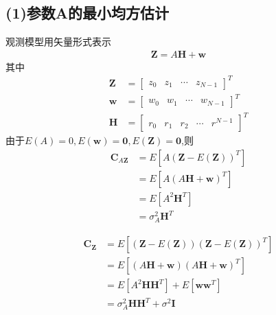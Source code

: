 \documentclass[fontset=windows]{article}
\numberwithin{figure}{section}
\begin{document}
\subsection*{(1)参数A的最小均方估计}
观测模型用矢量形式表示
\begin{align*}
    \mathbf{Z}=A\mathbf{H}+\mathbf{w}
\end{align*}
其中
\begin{align*}
    \mathbf{Z} & =\begin{bmatrix}z_0&z_1&\cdots&z_{N-1}\end{bmatrix}^T \\
    \mathbf{w} & =\begin{bmatrix}w_0&w_1&\cdots&w_{N-1}\end{bmatrix}^T \\
    \mathbf{H} & =\begin{bmatrix}r_0&r_1&r_2&\cdots&r^{N-1}\end{bmatrix}^T
\end{align*}
由于\(E(A)=0,E(\mathbf{w})=\mathbf{0},E(\mathbf{Z})=\mathbf{0}\),则
\begin{align*}
    \mathbf{C}_{A\mathbf{Z}}
     & =E[A(\mathbf{Z}-E(\mathbf{Z}))^T] \\
     & =E[A(A\mathbf{H}+\mathbf{w})^T]   \\
     & =E[A^2\mathbf{H}^T]               \\
     & =\sigma^2_A\mathbf{H}^T
\end{align*}

\begin{align*}
    \mathbf{C}_{\mathbf{Z}}
     & =E[(\mathbf{Z}-E(\mathbf{Z}))(\mathbf{Z}-E(\mathbf{Z}))^T] \\
     & =E[(A\mathbf{H}+\mathbf{w})(A\mathbf{H}+\mathbf{w})^T]     \\
     & =E[A^2\mathbf{H}\mathbf{H}^T]+E[\mathbf{w}\mathbf{w}^T]    \\
     & =\sigma^2_A\mathbf{HH}^T+\sigma^2\mathbf{I}
\end{align*}
\end{document}
